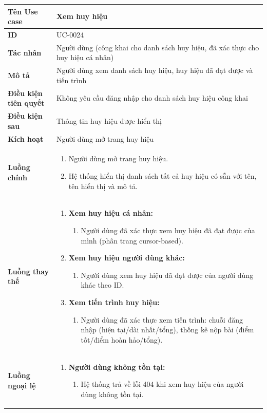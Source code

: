 {
\small
\renewcommand{\arraystretch}{1.15}

\begin{tabularx}{\textwidth}{|>{\raggedright\arraybackslash}p{3.5cm}|>{\raggedright\arraybackslash}X|}
\hline
\textbf{Tên Use case} & Xem huy hiệu \\
\hline
\textbf{ID} & UC-0024 \\
\hline
\textbf{Tác nhân} & Người dùng (công khai cho danh sách huy hiệu, đã xác thực cho huy hiệu cá nhân) \\
\hline
\textbf{Mô tả} & Người dùng xem danh sách huy hiệu, huy hiệu đã đạt được và tiến trình \\
\hline
\textbf{Điều kiện tiên quyết} & Không yêu cầu đăng nhập cho danh sách huy hiệu công khai \\
\hline
\textbf{Điều kiện sau} & Thông tin huy hiệu được hiển thị \\
\hline
\textbf{Kích hoạt} & Người dùng mở trang huy hiệu \\
\hline
\textbf{Luồng chính} &
\begin{enumerate}
    \item Người dùng mở trang huy hiệu.
    \item Hệ thống hiển thị danh sách tất cả huy hiệu có sẵn với tên, tên hiển thị và mô tả.
\end{enumerate} \\
\hline
\textbf{Luồng thay thế} &
\begin{enumerate}
    \item \textbf{Xem huy hiệu cá nhân:}
    \begin{enumerate}
        \item[1A.] Người dùng đã xác thực xem huy hiệu đã đạt được của mình (phân trang cursor-based).
    \end{enumerate}
    \item \textbf{Xem huy hiệu người dùng khác:}
    \begin{enumerate}
        \item[1B.] Người dùng xem huy hiệu đã đạt được của người dùng khác theo ID.
    \end{enumerate}
    \item \textbf{Xem tiến trình huy hiệu:}
    \begin{enumerate}
        \item[1C.] Người dùng đã xác thực xem tiến trình: chuỗi đăng nhập (hiện tại/dài nhất/tổng), thống kê nộp bài (điểm tốt/điểm hoàn hảo/tổng).
    \end{enumerate}
\end{enumerate} \\
\hline
\textbf{Luồng ngoại lệ} &
\begin{enumerate}
    \item \textbf{Người dùng không tồn tại:}
    \begin{enumerate}
        \item[1BErr.] Hệ thống trả về lỗi 404 khi xem huy hiệu của người dùng không tồn tại.
    \end{enumerate}
\end{enumerate} \\
\hline
\end{tabularx}
}
